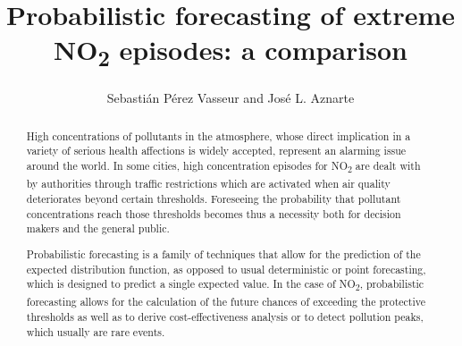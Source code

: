\documentclass[a4paper,3p,sort&compress]{elsarticle}
\begin{document}
\linenumbers

\newcommand{\no}{NO\textsubscript{2}\xspace}

\begin{frontmatter}

  \title{Probabilistic forecasting of extreme \no episodes: a comparison}


\author{Sebasti\'an P\'erez Vasseur and Jos\'e L. Aznarte}
\address{Artificial Intelligence Department\\Universidad Nacional de
  Educaci\'on a Distancia --- UNED\\c/ Juan del Rosal, 16, Madrid, Spain}


\begin{abstract}

  High concentrations of pollutants in the atmosphere, whose direct implication
  in a variety of serious health affections is widely accepted, represent an
  alarming issue around the world. In some cities, high concentration episodes
  for \no are dealt with by authorities through traffic restrictions which are
  activated when air quality deteriorates beyond certain thresholds. Foreseeing
  the probability that pollutant concentrations reach those thresholds becomes
  thus a necessity both for decision makers and the general public.

  Probabilistic forecasting is a family of techniques that allow for the
  prediction of the expected distribution function, as opposed to usual
  deterministic or point forecasting, which is designed to predict a single
  expected value. In the case of \no, probabilistic forecasting allows for the
  calculation of the future chances of exceeding the protective thresholds as
  well as to derive cost-effectiveness analysis or to detect pollution peaks,
  which usually are rare events.


\end{abstract}
\end{frontmatter}
\end{document}
